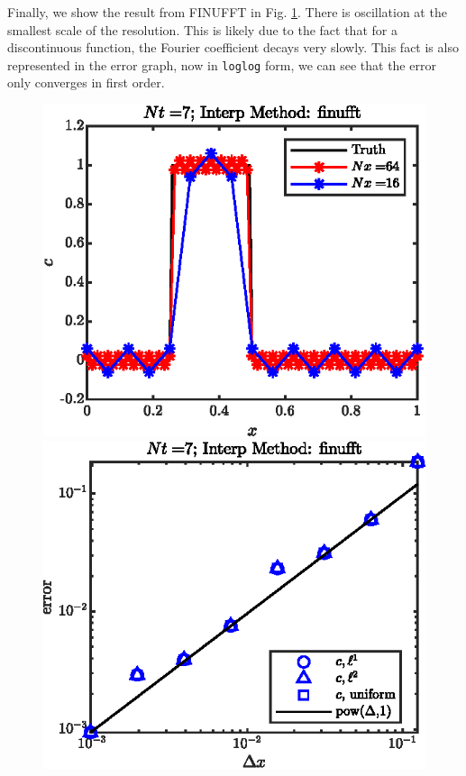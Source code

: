 \documentclass[11pt,letterpaper]{article}
\begin{document}
Finally, we show the result from FINUFFT in Fig. \ref{fig:1D_step_cons_finufft_sol}. There is oscillation at the smallest scale of the resolution. This is likely due to the fact that for a discontinuous function, the Fourier coefficient decays very slowly. This fact is also represented in the error graph, now in \texttt{loglog} form, we can see that the error only converges in first order. 
\begin{figure}[H]
    \centering
    \includegraphics{figs/1D_step_cons_finufft_sol}
    \includegraphics{figs/1D_step_cons_finufft_convord}
    \caption{}\label{fig:1D_step_cons_finufft_sol}
\end{figure}
\end{document}
